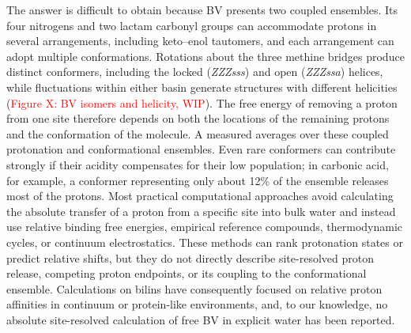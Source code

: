 The answer is difficult to obtain because BV presents two coupled ensembles. Its four nitrogens and two lactam carbonyl groups can accommodate protons in several arrangements, including keto--enol tautomers, and each arrangement can adopt multiple conformations.\cite{villegas-escobarKetoEnolTautomerism2021a,tongManyRoadsSeam2026} Rotations about the three methine bridges produce distinct conformers, including the locked (\emph{ZZZsss}) and open (\emph{ZZZssa}) helices, while fluctuations within either basin generate structures with different helicities (\textcolor{red}{Figure X: BV isomers and helicity, WIP}). The free energy of removing a proton from one site therefore depends on both the locations of the remaining protons and the conformation of the molecule. A measured \pka{} averages over these coupled protonation and conformational ensembles. Even rare conformers can contribute strongly if their acidity compensates for their low population; in carbonic acid, for example, a conformer representing only about 12\% of the ensemble releases most of the protons.\cite{zhaoInitioDeepNeural2025} Most practical computational approaches avoid calculating the absolute transfer of a proton from a specific site into bulk water and instead use relative binding free energies, empirical reference compounds, thermodynamic cycles, or continuum electrostatics.\cite{chengRedoxPotentialsAcidity2014,navoComputerPredictionKa2021,pliegoThermodynamicCyclesCalculation2003,casasnovasTheoreticalKaCalculations2014} These methods can rank protonation states or predict relative shifts, but they do not directly describe site-resolved proton release, competing proton endpoints, or its coupling to the conformational ensemble. Calculations on bilins have consequently focused on relative proton affinities in continuum or protein-like environments,\cite{borgRelativeGroundExcitedState2007,corbellaDeterminationProtonationPreferences2018} and, to our knowledge, no absolute site-resolved \pka{} calculation of free BV in explicit water has been reported.

